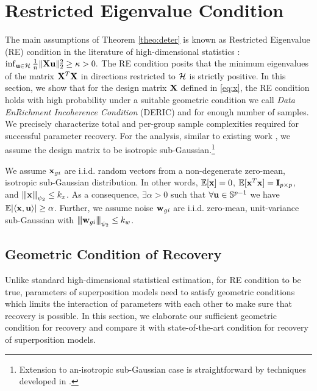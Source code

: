 \section{Restricted Eigenvalue Condition}
\label{sec:re}
The main assumptions of Theorem \ref{theo:deter} is known as Restricted Eigenvalue (RE) condition in the literature of high-dimensional statistics \cite{banerjee14, nrwy12, raskutti10}:
$\inf_{\u \in \cH} \frac{1}{n} \norm{\X \u}{2}^2 \geq \kappa > 0.$
The RE condition posits that the minimum eigenvalues of the matrix $\mathbf{X}^T \mathbf{X}$ in directions restricted to $\cH$ is strictly positive.
In this section, we show that for the design matrix $\mathbf{X}$ defined in \eqref{eq:x}, the RE condition holds with high probability under a suitable geometric condition we call {\em Data EnRichment Incoherence Condition} (DERIC) and for enough number of samples.
We precisely characterize total and per-group sample complexities required for successful parameter recovery.
For the analysis, similar to existing work \cite{guba16, mend15, trop15}, we assume the design matrix to be isotropic sub-Gaussian.\footnote{Extension to an-isotropic sub-Gaussian case is straightforward by techniques developed in \cite{banerjee14, ruzh13}.}
\begin{definition}
	\label{def:obs}
	We assume $\mathbf{x}_{gi}$ are i.i.d. random vectors from a non-degenerate zero-mean, isotropic sub-Gaussian distribution. In other words, $\mathbb{E} [\mathbf{x}] = 0$, $\mathbb{E} [\mathbf{x}^T \mathbf{x}] = \mathbf{I}_{p \times p}$, and ${\left\vert\kern-0.25ex\left\vert\kern-0.25ex\left\vert \mathbf{x} \right\vert\kern-0.25ex\right\vert\kern-0.25ex\right\vert}_{\psi_2} \leq k_x$.	
As a consequence, $\exists \alpha > 0$ such that $\forall \mathbf{u} \in \mathbb S^{p-1}$ we have $ \mathbb{E}|\langle \mathbf{x}, \mathbf{u} \rangle| \geq \alpha$. Further, we assume noise $\mathbf{w}_{gi} $ are i.i.d.
zero-mean, unit-variance sub-Gaussian with ${\left\vert\kern-0.25ex\left\vert\kern-0.25ex\left\vert \mathbf{w}_{gi} \right\vert\kern-0.25ex\right\vert\kern-0.25ex\right\vert}_{\psi_2} \leq k_w$.
\end{definition}

\subsection{Geometric Condition of Recovery}
Unlike standard high-dimensional statistical estimation, for RE condition to be true, parameters of superposition models need to satisfy geometric conditions which limits the interaction of parameters with each other to make sure that recovery is possible. In this section, we elaborate our sufficient geometric condition for recovery and compare it with state-of-the-art condition for recovery of superposition models. 

